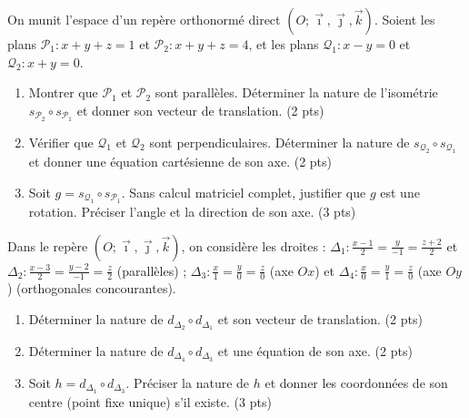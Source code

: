 \documentclass[11pt]{article}
\begin{document}
\begin{exercice}
On munit l'espace d'un repère orthonormé direct $(O;\vec{\imath},\vec{\jmath},\vec{k})$. Soient les plans $\mathcal{P}_1 : x + y + z = 1$ et $\mathcal{P}_2 : x + y + z = 4$, et les plans $\mathcal{Q}_1 : x - y = 0$ et $\mathcal{Q}_2 : x + y = 0$.
\begin{enumerate}
    \item Montrer que $\mathcal{P}_1$ et $\mathcal{P}_2$ sont parallèles. Déterminer la nature de l'isométrie $s_{\mathcal{P}_2} \circ s_{\mathcal{P}_1}$ et donner son vecteur de translation. \hfill (2 pts)
    \item Vérifier que $\mathcal{Q}_1$ et $\mathcal{Q}_2$ sont perpendiculaires. Déterminer la nature de $s_{\mathcal{Q}_2} \circ s_{\mathcal{Q}_1}$ et donner une équation cartésienne de son axe. \hfill (2 pts)
    \item Soit $g = s_{\mathcal{Q}_1} \circ s_{\mathcal{P}_1}$. Sans calcul matriciel complet, justifier que $g$ est une rotation. Préciser l'angle et la direction de son axe. \hfill (3 pts)
\end{enumerate}
\end{exercice}

\begin{exercice}
Dans le repère $(O;\vec{\imath},\vec{\jmath},\vec{k})$, on considère les droites :
$\Delta_1 : \frac{x-1}{2} = \frac{y}{-1} = \frac{z+2}{2}$ et $\Delta_2 : \frac{x-3}{2} = \frac{y-2}{-1} = \frac{z}{2}$ (parallèles) ;
$\Delta_3 : \frac{x}{1} = \frac{y}{0} = \frac{z}{0}$ (axe $Ox$) et $\Delta_4 : \frac{x}{0} = \frac{y}{1} = \frac{z}{0}$ (axe $Oy$) (orthogonales concourantes).
\begin{enumerate}
    \item Déterminer la nature de $d_{\Delta_2} \circ d_{\Delta_1}$ et son vecteur de translation. \hfill (2 pts)
    \item Déterminer la nature de $d_{\Delta_4} \circ d_{\Delta_3}$ et une équation de son axe. \hfill (2 pts)
    \item Soit $h = d_{\Delta_1} \circ d_{\Delta_3}$. Préciser la nature de $h$ et donner les coordonnées de son centre (point fixe unique) s'il existe. \hfill (3 pts)
\end{enumerate}
\end{exercice}
\end{document}
